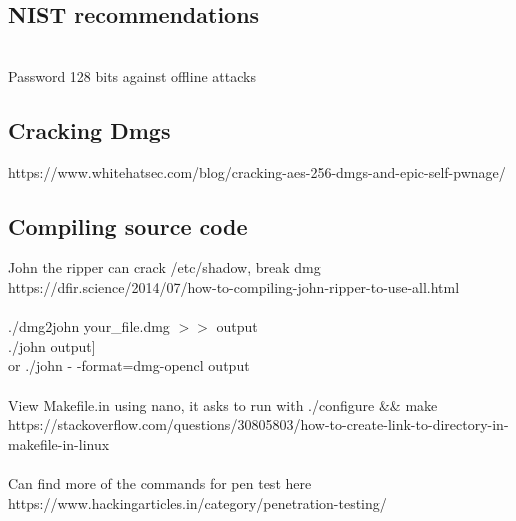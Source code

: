 \documentclass[11pt]{article}
\begin{document}
\begin{multicols*}{3}
\subsection*{NIST recommendations}\\
Password 128 bits against offline attacks 
\subsection*{Cracking Dmgs}
\textcolor{link}{https://www.whitehatsec.com/blog/cracking-aes-256-dmgs-and-epic-self-pwnage/}
\\
\subsection*{Compiling source code}
John the ripper can crack /etc/shadow, break dmg\\
\textcolor{link}{https://dfir.science/2014/07/how-to-compiling-john-ripper-to-use-all.html}\\
\\./dmg2john your\_file.dmg $>>$ output
\\./john output]\\
or ./john - -format=dmg-opencl output\\
\\
View Makefile.in using nano, it asks to run with ./configure && make\\
\textcolor{link}{https://stackoverflow.com/questions/30805803/how-to-create-link-to-directory-in-makefile-in-linux}\\
\\
Can find more of the commands for pen test here\\
\textcolor{link}{https://www.hackingarticles.in/category/penetration-testing/}
\end{multicols*}
\end{document}
